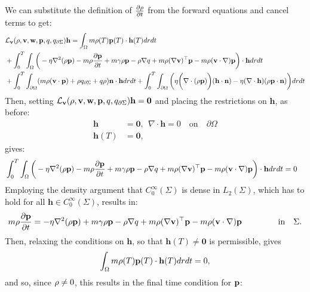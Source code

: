 We can substitute the definition of $\frac{\partial \rho}{\partial t}$ from the forward equations and cancel terms to get:
\begin{align*}
&\mathcal{L}_{\mathbf{v}}(\rho,\mathbf{v},\mathbf{w},\mathbf{p},q,{q}_{\partial \Sigma}) \mathbf{h} = \int_\Omega m \rho(T) \mathbf{p}(T) \cdot \mathbf{h}(T) dr dt\\
&+\int_0^T \int_\Omega 
\bigg( - \eta\nabla^2 (\rho \mathbf{p})  -  m\rho \frac{\partial \mathbf{p}}{\partial t} +m \gamma \rho \mathbf{p}-\rho\nabla q +m \rho (\nabla \mathbf{v})^\top\mathbf{p} 
-m \rho (\mathbf{v} \cdot \nabla)\mathbf{p}  \bigg)\cdot  \mathbf{h} drdt\\
& +\int_0^T \int_{\partial\Omega} ( m \rho (\mathbf{v} \cdot \mathbf{p})+\rho  {q}_{\partial \Sigma} + q \rho)  \mathbf{n}\cdot \mathbf{h} dr dt + \int_0^T \int_{\partial \Omega} \bigg(\eta\bigg(\nabla \cdot(\rho \mathbf{p})\bigg) (\mathbf{h} \cdot \mathbf{n}) -   \eta (\nabla \cdot \mathbf{h}) (\rho \mathbf{p} \cdot \mathbf{n}) \bigg)dr dt\\
\end{align*}
Then, setting $\mathcal{L}_{\mathbf{v}}(\rho,\mathbf{v},\mathbf{w},\mathbf{p},q,{q}_{\partial \Sigma}) \mathbf{h}=\mathbf{0}$ and placing the restrictions on $\mathbf{h}$, as before:
\begin{align*}
\mathbf{h}&=\mathbf{0}, \ \ \nabla \cdot \mathbf{h} = 0 \quad \text{on} \quad \partial \Omega\\
\mathbf{h}(T)&=\mathbf{0},
\end{align*}
gives:
\begin{align*}
&\int_0^T \int_\Omega 
\bigg(- \eta\nabla^2 (\rho \mathbf{p})  -  m\rho \frac{\partial \mathbf{p}}{\partial t} +m \gamma \rho \mathbf{p}-\rho\nabla q +m \rho (\nabla \mathbf{v})^\top\mathbf{p} 
-m \rho (\mathbf{v} \cdot \nabla)\mathbf{p}   \bigg)\cdot  \mathbf{h} drdt = 0
\end{align*}
Employing the density argument that $C_0^\infty(\Sigma)$ is dense in $L_2(\Sigma)$, which has to hold for all $\mathbf{h}\in C_0^\infty(\Sigma)$, results in:
\begin{align*}
 m\rho \frac{\partial \mathbf{p}}{\partial t}  = - \eta\nabla^2 (\rho \mathbf{p})  +m \gamma \rho \mathbf{p}-\rho\nabla q +m \rho (\nabla \mathbf{v})^\top\mathbf{p} 
-m \rho (\mathbf{v} \cdot \nabla)\mathbf{p}   \ \qquad\qquad \text{in} \quad \Sigma.
\end{align*}
Then, relaxing the conditions on $\mathbf{h}$, so that $\mathbf{h}(T) \neq \mathbf{0} $ is permissible, gives
\begin{align*}
 \int_\Omega m \rho(T) \mathbf{p}(T) \cdot \mathbf{h}(T) dr dt=0,
\end{align*}
and so, since $\rho \neq 0$, this results in the final time condition for $\mathbf{p}$:
